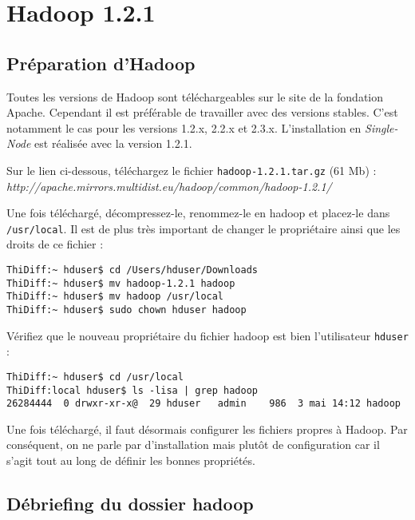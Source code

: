 \section{Hadoop 1.2.1}
\subsection{Préparation d'Hadoop}

\par Toutes les versions de Hadoop sont téléchargeables sur le site de la fondation Apache. Cependant il est préférable de travailler avec des versions stables. C'est notamment le cas pour les versions 1.2.x, 2.2.x et 2.3.x. L'installation en \emph{Single-Node} est réalisée avec la version 1.2.1.

\par Sur le lien ci-dessous, téléchargez le fichier \texttt{hadoop-1.2.1.tar.gz}  (61 Mb) :\\
\emph{http://apache.mirrors.multidist.eu/hadoop/common/hadoop-1.2.1/}

\par Une fois téléchargé, décompressez-le, renommez-le en hadoop et placez-le dans \texttt{/usr/local}. Il est de plus très important de changer le propriétaire ainsi que les droits de ce fichier :

\begin{verbatim}
ThiDiff:~ hduser$ cd /Users/hduser/Downloads
ThiDiff:~ hduser$ mv hadoop-1.2.1 hadoop
ThiDiff:~ hduser$ mv hadoop /usr/local
ThiDiff:~ hduser$ sudo chown hduser hadoop
\end{verbatim}

\par Vérifiez que le nouveau propriétaire du fichier hadoop est bien l'utilisateur \texttt{hduser} :

\begin{verbatim}
ThiDiff:~ hduser$ cd /usr/local
ThiDiff:local hduser$ ls -lisa | grep hadoop
26284444  0 drwxr-xr-x@  29 hduser   admin    986  3 mai 14:12 hadoop
\end{verbatim}

\par Une fois téléchargé, il faut désormais configurer les fichiers propres à Hadoop. Par conséquent, on ne parle par d'installation mais plutôt de configuration car il s'agit tout au long de définir les bonnes propriétés.

\subsection{Débriefing du dossier hadoop}


